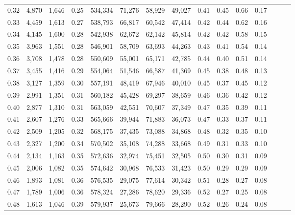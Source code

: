 \begin{tabular}{rrrrrrrrrrrrrrr}
0.32 &   4,870 &  1,646 &  0.25 &  534,334 &   71,276 &   58,929 &   49,027 &  0.41 &  0.45 &  0.66 &      0.17 \\
0.33 &   4,459 &  1,613 &  0.27 &  538,793 &   66,817 &   60,542 &   47,414 &  0.42 &  0.44 &  0.62 &      0.16 \\
0.34 &   4,145 &  1,600 &  0.28 &  542,938 &   62,672 &   62,142 &   45,814 &  0.42 &  0.42 &  0.58 &      0.15 \\
0.35 &   3,963 &  1,551 &  0.28 &  546,901 &   58,709 &   63,693 &   44,263 &  0.43 &  0.41 &  0.54 &      0.14 \\
0.36 &   3,708 &  1,478 &  0.28 &  550,609 &   55,001 &   65,171 &   42,785 &  0.44 &  0.40 &  0.51 &      0.14 \\
0.37 &   3,455 &  1,416 &  0.29 &  554,064 &   51,546 &   66,587 &   41,369 &  0.45 &  0.38 &  0.48 &      0.13 \\
0.38 &   3,127 &  1,359 &  0.30 &  557,191 &   48,419 &   67,946 &   40,010 &  0.45 &  0.37 &  0.45 &      0.12 \\
0.39 &   2,991 &  1,351 &  0.31 &  560,182 &   45,428 &   69,297 &   38,659 &  0.46 &  0.36 &  0.42 &      0.12 \\
0.40 &   2,877 &  1,310 &  0.31 &  563,059 &   42,551 &   70,607 &   37,349 &  0.47 &  0.35 &  0.39 &      0.11 \\
0.41 &   2,607 &  1,276 &  0.33 &  565,666 &   39,944 &   71,883 &   36,073 &  0.47 &  0.33 &  0.37 &      0.11 \\
0.42 &   2,509 &  1,205 &  0.32 &  568,175 &   37,435 &   73,088 &   34,868 &  0.48 &  0.32 &  0.35 &      0.10 \\
0.43 &   2,327 &  1,200 &  0.34 &  570,502 &   35,108 &   74,288 &   33,668 &  0.49 &  0.31 &  0.33 &      0.10 \\
0.44 &   2,134 &  1,163 &  0.35 &  572,636 &   32,974 &   75,451 &   32,505 &  0.50 &  0.30 &  0.31 &      0.09 \\
0.45 &   2,006 &  1,082 &  0.35 &  574,642 &   30,968 &   76,533 &   31,423 &  0.50 &  0.29 &  0.29 &      0.09 \\
0.46 &   1,893 &  1,081 &  0.36 &  576,535 &   29,075 &   77,614 &   30,342 &  0.51 &  0.28 &  0.27 &      0.08 \\
0.47 &   1,789 &  1,006 &  0.36 &  578,324 &   27,286 &   78,620 &   29,336 &  0.52 &  0.27 &  0.25 &      0.08 \\
0.48 &   1,613 &  1,046 &  0.39 &  579,937 &   25,673 &   79,666 &   28,290 &  0.52 &  0.26 &  0.24 &      0.08 \\

\end{tabular}
